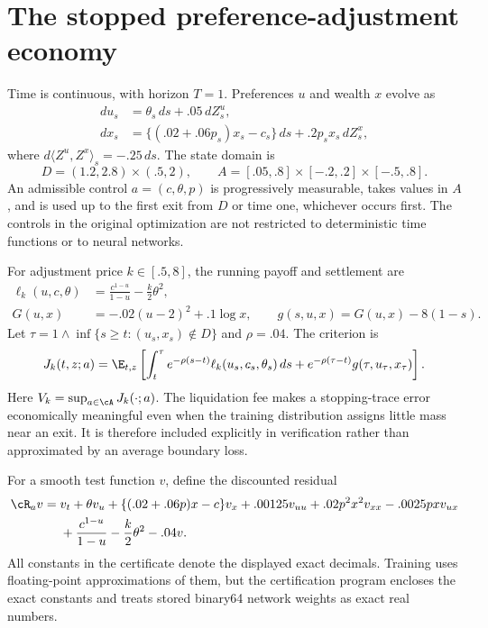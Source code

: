 \section{The stopped preference-adjustment economy}\label{sec:economy}
Time is continuous, with horizon $T=1$. Preferences $u$ and wealth $x$ evolve as
\begin{align}
 du_s&=\theta_s\,ds+.05\,dZ^u_s,\label{eq:u}\\
 dx_s&=\{(.02+.06p_s)x_s-c_s\}\,ds+.2p_sx_s\,dZ^x_s,\label{eq:x}
\end{align}
where $d\langle Z^u,Z^x\rangle_s=-.25\,ds$. The state domain is
\[
 D=(1.2,2.8)\times(.5,2),
 \qquad A=[.05,.8]\times[-.2,.2]\times[-.5,.8].
\]
An admissible control $a=(c,\theta,p)$ is progressively measurable, takes values in $A$, and is used up to the first exit from $D$ or time one, whichever occurs first. The controls in the original optimization are not restricted to deterministic time functions or to neural networks.

For adjustment price $k\in[.5,8]$, the running payoff and settlement are
\begin{align}
 \ell_k(u,c,\theta)&=\frac{c^{1-u}}{1-u}-\frac{k}{2}\theta^2,\label{eq:ell}\\
 G(u,x)&=-.02(u-2)^2+.1\log x,\qquad
 g(s,u,x)=G(u,x)-8(1-s).\label{eq:trace}
\end{align}
Let $\tau=1\wedge\inf\{s\geq t:(u_s,x_s)\notin D\}$ and $\rho=.04$. The criterion is
\begin{equation}
 J_k(t,z;a)=\E_{t,z}\left[\int_t^\tau e^{-\rho(s-t)}\ell_k(u_s,c_s,\theta_s)\,ds
       +e^{-\rho(\tau-t)}g(\tau,u_\tau,x_\tau)\right].
 \label{eq:value}
\end{equation}
Here $V_k=\sup_{a\in\cA}J_k(\cdot;a)$. The liquidation fee makes a stopping-trace error economically meaningful even when the training distribution assigns little mass near an exit. It is therefore included explicitly in verification rather than approximated by an average boundary loss.

For a smooth test function $v$, define the discounted residual
\begin{align}
 \cR_a v={}&v_t+\theta v_u+\{(.02+.06p)x-c\}v_x
       +.00125v_{uu}+.02p^2x^2v_{xx}-.0025pxv_{ux}\notag\\
       &+\frac{c^{1-u}}{1-u}-\frac{k}{2}\theta^2-.04v.
 \label{eq:residual}
\end{align}
All constants in the certificate denote the displayed exact decimals. Training uses floating-point approximations of them, but the certification program encloses the exact constants and treats stored binary64 network weights as exact real numbers.

